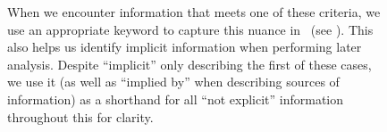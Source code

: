\begin{figure}[h!]

When we encounter information that meets one of these criteria, we use an
appropriate keyword to capture this nuance in \ourApproachGlossary{}\ifnotpaper\
    (see )\fi. This also helps us identify implicit
information when performing later analysis. Despite ``implicit'' only
describing the first of these cases, we use it (as well as ``implied by'' when
describing sources of information) as a shorthand for all ``not explicit''
information throughout this \docType{} for clarity.


\end{figure}
